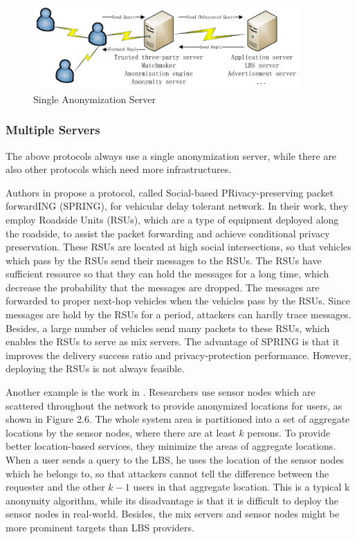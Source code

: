 \begin{figure} [H]
  \centering 
  \includegraphics[width=4.0in]{figures/Fig_Single_Ano_Ser.png}
  \caption{Single Anonymization Server} 
  \label{fig:SingleAnoymizationServer} %
\end{figure}

\subsubsection{ Multiple Servers}

\noindent The above protocols always use a single anonymization server, while there are also other protocols which need more infrastructures. 

Authors in \cite {C25} propose a protocol, called Social-based PRivacy-preserving packet forwardING (SPRING), for vehicular delay tolerant network. In their work, they employ Roadside Units (RSUs), which are a type of equipment deployed along the roadside, to assist the packet forwarding and achieve conditional privacy preservation. These RSUs are located at high social intersections, so that vehicles which pass by the RSUs send their messages to the RSUs. The RSUs have sufficient resource so that they can hold the messages for a long time, which decrease the probability that the messages are dropped. The messages are forwarded to proper next-hop vehicles when the vehicles pass by the RSUs. Since messages are hold by the RSUs for a period, attackers can hardly trace messages. Besides, a large number of vehicles send many packets to these RSUs, which enables the RSUs to serve as mix servers. The advantage of SPRING is that it improves the delivery success ratio and privacy-protection performance. However, deploying the RSUs is not always feasible.

Another example is the work in \cite {C26}. Researchers use sensor nodes which are scattered throughout the network to provide anonymized locations for users, as shown in Figure 2.6. The whole system area is partitioned into a set of aggregate locations by the sensor nodes, where there are at least $k$ persons. To provide better location-based services, they minimize the areas of aggregate locations. When a user sends a query to the LBS, he uses the location of the sensor nodes which he belongs to, so that attackers cannot tell the difference between the requester and the other $k-1$ users in that aggregate location. This is a typical k anonymity algorithm, while its disadvantage is that it is difficult to deploy the sensor nodes in real-world. Besides, the mix servers and sensor nodes might be more prominent targets than LBS providers.

